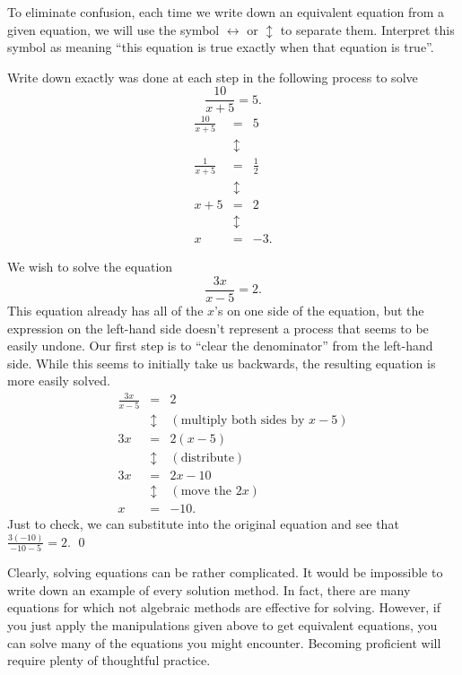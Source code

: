 \par

To eliminate confusion, each time we write down an equivalent equation from a given equation, we will use the symbol $\longleftrightarrow$ or $\updownarrow$ to separate them. Interpret this symbol as meaning ``this equation is true exactly when that equation is true''.

\par

\begin{question} Write down exactly was done at each step in the following process to solve
\[
\frac{10}{x+5} = 5.
\]
\begin{eqnarray*}
\frac{10}{x+5} & = & 5\\
\ & \updownarrow & \\
\frac{1}{x+5} & =  & \frac{1}{2}\\
\ & \updownarrow & \\
x+5 & = & 2\\
\ & \updownarrow & \\
x & = & -3.
\end{eqnarray*}

\end{question}

\par
\begin{eg} We wish to solve the equation
\[
\frac{3x}{x-5} = 2.
\]
This equation already has all of the $x$'s on one side of the equation, but the expression on the left-hand side doesn't represent a process that seems to be easily undone. Our first step is to ``clear the denominator'' from the left-hand side. While this seems to initially take us backwards, the resulting equation is more easily solved.
\begin{eqnarray*}
\frac{3x}{x-5} & = & 2\\
\ & \updownarrow & (\mbox{multiply both sides by\ } x-5)\\
3x & = & 2(x-5)\\
\ & \updownarrow & (\mbox{distribute})\\
3x & = & 2x-10\\
\ & \updownarrow & (\mbox{move the\ } 2x)\\
x & = & -10.
\end{eqnarray*}
Just to check, we can substitute into the original equation and see that $\frac{3(-10)}{-10-5} = 2$. \qed \end{eg}

Clearly, solving equations can be rather complicated. It would be impossible to write down an example of every solution method. In fact, there are many equations for which not algebraic methods are effective for solving. However, if you just apply the manipulations given above to get equivalent equations, you can solve many of the equations you might encounter. Becoming proficient will require plenty of thoughtful practice.

